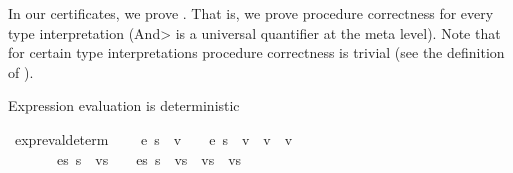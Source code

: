 \begin{isabellebody}
\begin{isamarkuptext}
In our certificates, we prove 
.
That is, we prove procedure correctness for every type interpretation (\<And> is a universal quantifier at 
the meta level). Note that for certain type interpretations procedure correctness is trivial (see
the definition of ).%
\end{isamarkuptext}\isamarkuptrue%
%
\isadelimdocument
%
\endisadelimdocument
%
\isatagdocument
%
\isamarkuptrue%
%
\endisatagdocument
{\isafolddocument}%
%
\isadelimdocument
%
\endisadelimdocument
%
\begin{isamarkuptext}%
Expression evaluation is deterministic%
\end{isamarkuptext}\isamarkuptrue%
\isamarkupfalse%
\ expr{\isacharunderscore}{\kern0pt}eval{\isacharunderscore}{\kern0pt}determ{\isacharcolon}{\kern0pt}\ \isanewline
{}\ {\isachardoublequoteopen}{\isacharparenleft}{\kern0pt}{\isacharparenleft}{\kern0pt}{\isasymLambda}{\isacharcomma}{\kern0pt}{\isasymGamma}{\isacharcomma}{\kern0pt}{\isasymOmega}\ {\isasymturnstile}\ {\isasymlangle}e{}{\isacharcomma}{\kern0pt}\ s{\isasymrangle}\ {\isasymDown}\ v{\isacharparenright}{\kern0pt}\ {\isasymLongrightarrow}\ {\isacharparenleft}{\kern0pt}{\isacharparenleft}{\kern0pt}{\isasymLambda}{\isacharcomma}{\kern0pt}{\isasymGamma}{\isacharcomma}{\kern0pt}{\isasymOmega}\ {\isasymturnstile}\ {\isasymlangle}e{}{\isacharcomma}{\kern0pt}\ s{\isasymrangle}\ {\isasymDown}\ v{\isacharprime}{\kern0pt}{\isacharparenright}{\kern0pt}\ {\isasymLongrightarrow}\ v\ {\isacharequal}{\kern0pt}\ v{\isacharprime}{\kern0pt}{\isacharparenright}{\kern0pt}{\isacharparenright}{\kern0pt}{\isachardoublequoteclose}\ \ \isanewline
\ \ \ \ \ {\isachardoublequoteopen}{\isacharparenleft}{\kern0pt}{\isasymLambda}{\isacharcomma}{\kern0pt}{\isasymGamma}{\isacharcomma}{\kern0pt}{\isasymOmega}\ {\isasymturnstile}\ {\isasymlangle}es{\isacharcomma}{\kern0pt}\ s{\isasymrangle}\ {\isacharbrackleft}{\kern0pt}{\isasymDown}{\isacharbrackright}{\kern0pt}\ vs{\isacharparenright}{\kern0pt}\ {\isasymLongrightarrow}\ {\isacharparenleft}{\kern0pt}{\isasymLambda}{\isacharcomma}{\kern0pt}{\isasymGamma}{\isacharcomma}{\kern0pt}{\isasymOmega}\ {\isasymturnstile}\ {\isasymlangle}es{\isacharcomma}{\kern0pt}\ s{\isasymrangle}\ {\isacharbrackleft}{\kern0pt}{\isasymDown}{\isacharbrackright}{\kern0pt}\ vs{\isacharprime}{\kern0pt}{\isacharparenright}{\kern0pt}\ {\isasymLongrightarrow}\ vs\ {\isacharequal}{\kern0pt}\ vs{\isacharprime}{\kern0pt}\ {\isachardoublequoteclose}\isanewline

\end{isabellebody}

